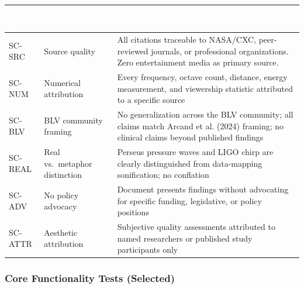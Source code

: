 \documentclass[11pt,letterpaper]{article}
\newcommand{\tableheader}[1]{\textbf{\sffamily\textcolor{white}{#1}}}
\begin{document}
\begin{center}
\begin{tabularx}{\textwidth}{C{1.5cm}L{4cm}X}
\toprule
{}
\tableheader{Test ID} & \tableheader{Verifies} & \tableheader{Expected Behavior} \\
\midrule
SC-SRC & Source quality & All citations traceable to NASA/CXC, peer-reviewed journals, or professional organizations. Zero entertainment media as primary source. \\
SC-NUM & Numerical attribution & Every frequency, octave count, distance, energy measurement, and viewership statistic attributed to a specific source \\
SC-BLV & BLV community framing & No generalization across the BLV community; all claims match Arcand et al. (2024) framing; no clinical claims beyond published findings \\
SC-REAL & Real vs.\ metaphor distinction & Perseus pressure waves and LIGO chirp are clearly distinguished from data-mapping sonification; no conflation \\
SC-ADV & No policy advocacy & Document presents findings without advocating for specific funding, legislative, or policy positions \\
SC-ATTR & Aesthetic attribution & Subjective quality assessments attributed to named researchers or published study participants only \\
\bottomrule
\end{tabularx}
\end{center}

\subsubsection{Core Functionality Tests (Selected)}
\end{document}
